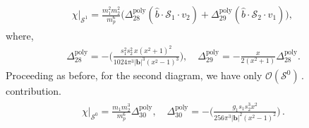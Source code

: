 \begin{align}
     \begin{split}  \label{eqt21} 
 \chi\Big|_{\mathcal{S}^{1}}= \frac{m_1^2 m_2^2}{m_p^6}\Bigg(\Delta_{\mathfrak{28}}^{\textrm{poly}}(\hat{b}\cdot\mathcal{S}_1\cdot v_2)+\Delta_{\mathfrak{29}}^{\textrm{poly}} (\hat{b}\cdot\mathcal{S}_2\cdot v_1)\Bigg),\,
     \end{split}
 \end{align}
 where,
 \begin{align}
     \Delta_{\mathfrak{28}}^{\textrm{poly}}=-\Bigg(\frac{s_1^2s_2^2\, x(x^2+1)^2}{1024 \pi ^3 |\boldsymbol{b}|^3 \left(x^2-1\right)^3}\Bigg), \quad \Delta_{\mathfrak{29}}^{\textrm{poly}}= -\frac{x}{2(x^2+1)}\Delta_{\mathfrak{28}}^{\textrm{poly}}.
 \end{align}
 Proceeding as before, for the second diagram, we have only  $\mathcal{O}(\mathcal{S}^0)\,.$  contribution.
 \begin{align}
     \begin{split}  \label{eqt22} 
    \chi \Big|_{\mathcal{S}^0}=\frac{m_1m_2^3}{m_p^6}\Delta_{\mathfrak{30}}^{\textrm{poly}},\quad \Delta_{\mathfrak{30}}^{\textrm{poly}}=-\Bigg(\frac{g_{1} s_{1} s_{2}^3 x^2}{256 \pi ^3 |\boldsymbol{b}|^2 \left(x^2-1\right)^2}\Bigg)\,.
    \end{split}
 \end{align}
